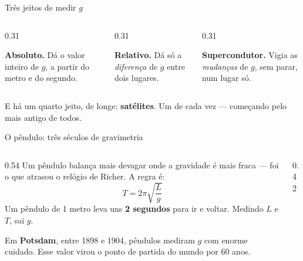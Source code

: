 \documentclass[aspectratio=169,11pt]{beamer}
\newcommand{\bnum}[1]{\textbf{\textcolor{mTeal}{#1}}}
\begin{document}
\begin{frame}{Três jeitos de medir $g$}
  \begin{columns}[T]
    \begin{column}{0.31\textwidth}
      \begin{regra}[title={Uma queda}]
        \small\raggedright \textbf{Absoluto.} Dá o valor inteiro de $g$, a partir do metro e do segundo.
      \end{regra}
    \end{column}
    \begin{column}{0.31\textwidth}
      \begin{regra}[title={Uma mola}]
        \small\raggedright \textbf{Relativo.} Dá só a \emph{diferença} de $g$ entre dois lugares.
      \end{regra}
    \end{column}
    \begin{column}{0.31\textwidth}
      \begin{regra}[title={Uma esfera}]
        \small\raggedright \textbf{Supercondutor.} Vigia as \emph{mudanças} de $g$, sem parar, num lugar
        só.
      \end{regra}
    \end{column}
  \end{columns}
  \bigskip
  \centering
  E há um quarto jeito, de longe: \bnum{satélites}. Um de cada vez --- começando pelo mais
  antigo de todos.
\end{frame}

\begin{frame}{O pêndulo: três séculos de gravimetria}
  \begin{columns}[T]
    \begin{column}{0.54\textwidth}
      Um pêndulo balança mais devagar onde a gravidade é mais fraca --- foi o que atrasou o
      relógio de Richer. A regra é:
      \[ T = 2\pi \sqrt{\frac{L}{g}} \]
      Um pêndulo de 1 metro leva uns \bnum{2 segundos} para ir e voltar. Medindo $L$ e $T$,
      sai $g$.
      \medskip

      Em \textbf{Potsdam}, entre 1898 e 1904, pêndulos mediram $g$ com enorme cuidado.
      Esse valor virou o \alert{ponto de partida do mundo} por 60 anos.
    \end{column}
    \begin{column}{0.42\textwidth}
      \centering
    \end{column}
  \end{columns}
\end{frame}
\end{document}
